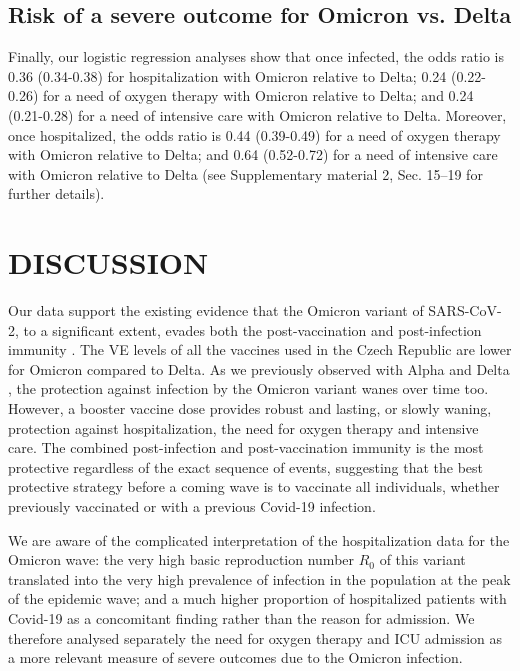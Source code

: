\documentclass[a4paper,12pt]{article}
\begin{document}
\subsection*{Risk of a severe outcome for Omicron vs. Delta}

Finally, our logistic regression analyses show that once infected, the odds ratio  is 0.36 (0.34-0.38) for hospitalization with Omicron relative to Delta;  0.24 (0.22-0.26) for a need of oxygen therapy with Omicron relative to Delta; and 0.24 (0.21-0.28) for a need of intensive care with Omicron relative to Delta. Moreover, once hospitalized, the odds ratio  is 0.44 (0.39-0.49) for a need of oxygen therapy with Omicron relative to Delta; and   0.64 (0.52-0.72) for a need of intensive care with Omicron relative to Delta (see Supplementary material 2, Sec. 15--19 for further details).

\section*{DISCUSSION}
\label{sec4}

Our data support the existing evidence that the Omicron variant of SARS-CoV-2, to a significant extent, evades both the post-vaccination and post-infection immunity \citep{mccallum2022,Dejnirattisai2022,Hoffmann2022,Cui2022,Cao2021}. The VE levels of all the vaccines used in the Czech Republic are lower for Omicron compared to Delta. As we previously observed with Alpha and Delta \citep{Berec2021preprint}, the protection against infection by the Omicron variant wanes over time too. However, a booster vaccine dose provides robust and lasting, or slowly waning, protection against hospitalization, the need for oxygen therapy and intensive care. The combined post-infection and post-vaccination immunity is the most protective regardless of the exact sequence of events, suggesting that the best protective strategy before a coming wave is to vaccinate all individuals, whether previously vaccinated or with a previous Covid-19 infection.

We are aware of the complicated interpretation of the hospitalization data for the Omicron wave:  the very high basic reproduction number $R_0$ of this variant \cite{nishiura2022relative} translated into the very high prevalence of infection in the population at the peak of the epidemic wave; and a much higher proportion of hospitalized patients with Covid-19 as a concomitant finding rather than the reason for admission. We therefore analysed separately the need for oxygen therapy and ICU admission as a more relevant measure of severe outcomes due to the Omicron infection.
\end{document}
